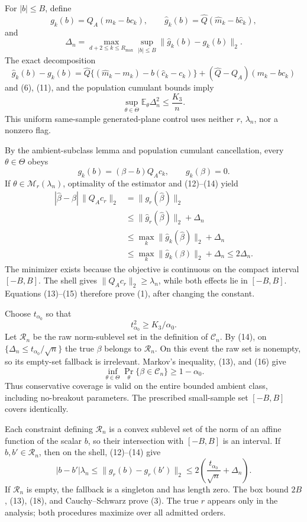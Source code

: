 For \(|b|\leq B\), define
\[
 g_k(b)=Q_A(m_k-bc_k),
 \qquad \widehat g_k(b)=\widehat Q(\widehat m_k-b\widehat c_k),
\]
and
\[
 \Delta_n=\max_{d+2\leq k\leq R_{\max}}
 \sup_{|b|\leq B}\|\widehat g_k(b)-g_k(b)\|_2.
\]
The exact decomposition
\[
 \widehat g_k(b)-g_k(b)
 =\widehat Q\{(\widehat m_k-m_k)-b(\widehat c_k-c_k)\}
  +(\widehat Q-Q_A)(m_k-bc_k)                                             \tag{12}
\]
and (6), (11), and the population cumulant bounds imply
\[
 \sup_{\theta\in\Theta}\mathbb E_\theta\Delta_n^2\leq\frac{K_3}{n}.    \tag{13}
\]
This uniform same-sample generated-plane control uses neither \(r\), \(\lambda_n\), nor a nonzero flag.

By the ambient-subclass lemma and population cumulant cancellation, every \(\theta\in\Theta\) obeys
\[
 g_k(b)=(\beta-b)Q_Ac_k,
 \qquad g_k(\beta)=0.                                                      \tag{14}
\]
If \(\theta\in\mathcal M_r(\lambda_n)\), optimality of the estimator and (12)--(14) yield
\[
 \begin{aligned}
 |\widehat\beta-\beta|\,\|Q_Ac_r\|_2
 &=\|g_r(\widehat\beta)\|_2\\
 &\leq\|\widehat g_r(\widehat\beta)\|_2+\Delta_n\\
 &\leq\max_k\|\widehat g_k(\widehat\beta)\|_2+\Delta_n\\
 &\leq\max_k\|\widehat g_k(\beta)\|_2+\Delta_n
 \leq2\Delta_n.
 \end{aligned}                                                            \tag{15}
\]
The minimizer exists because the objective is continuous on the compact interval \([-B,B]\).  The shell gives \(\|Q_Ac_r\|_2\geq\lambda_n\), while both effects lie in \([-B,B]\).  Equations (13)--(15) therefore prove (1), after changing the constant.

Choose \(t_{\alpha_0}\) so that
\[
 t_{\alpha_0}^2\geq K_3/\alpha_0.                                        \tag{16}
\]
Let \(\mathcal R_n\) be the raw norm-sublevel set in the definition of \(\mathcal C_n\).  By (14), on \(\{\Delta_n\leq t_{\alpha_0}/\sqrt n\}\) the true \(\beta\) belongs to \(\mathcal R_n\).  On this event the raw set is nonempty, so its empty-set fallback is irrelevant.  Markov's inequality, (13), and (16) give
\[
 \inf_{\theta\in\Theta}
 \Pr_\theta\{\beta\in\mathcal C_n\}\geq1-\alpha_0.                    \tag{17}
\]
Thus conservative coverage is valid on the entire bounded ambient class, including no-breakout parameters.  The prescribed small-sample set \([-B,B]\) covers identically.

Each constraint defining \(\mathcal R_n\) is a convex sublevel set of the norm of an affine function of the scalar \(b\), so their intersection with \([-B,B]\) is an interval.  If \(b,b'\in\mathcal R_n\), then on the shell, (12)--(14) give
\[
 |b-b'|\lambda_n
 \leq\|g_r(b)-g_r(b')\|_2
 \leq2\left(\frac{t_{\alpha_0}}{\sqrt n}+\Delta_n\right).               \tag{18}
\]
If \(\mathcal R_n\) is empty, the fallback is a singleton and has length zero.  The box bound \(2B\), (13), (18), and Cauchy--Schwarz prove (3).  The true \(r\) appears only in the analysis; both procedures maximize over all admitted orders.

